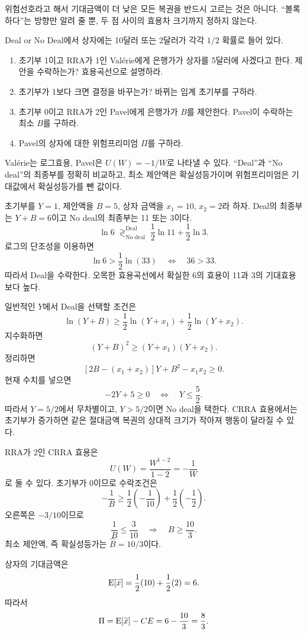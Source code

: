 \begin{warningbox}
위험선호라고 해서 기대금액이 더 낮은 모든 복권을 반드시 고르는 것은 아니다. ``볼록하다''는 방향만 알려 줄 뿐, 두 점 사이의 효용차 크기까지 정하지 않는다.
\end{warningbox}

\begin{officialbox}
Deal or No Deal에서 상자에는 10달러 또는 2달러가 각각 $1/2$ 확률로 들어 있다.
\begin{enumerate}[label=(\alph*)]
\item 초기부 1이고 RRA가 1인 Valérie에게 은행가가 상자를 5달러에 사겠다고 한다. 제안을 수락하는가? 효용곡선으로 설명하라.
\item 초기부가 1보다 크면 결정을 바꾸는가? 바뀌는 임계 초기부를 구하라.
\item 초기부 0이고 RRA가 2인 Pavel에게 은행가가 $B$를 제안한다. Pavel이 수락하는 최소 $B$를 구하라.
\item Pavel의 상자에 대한 위험프리미엄 $\Pi$를 구하라.
\end{enumerate}
\end{officialbox}

\begin{strategybox}
Valérie는 로그효용, Pavel은 $U(W)=-1/W$로 나타낼 수 있다. ``Deal''과 ``No deal''의 최종부를 정확히 비교하고, 최소 제안액은 확실성등가이며 위험프리미엄은 기대값에서 확실성등가를 뺀 값이다.
\end{strategybox}

\begin{solutionbox}
초기부를 $Y=1$, 제안액을 $B=5$, 상자 금액을 $x_1=10$, $x_2=2$라 하자. Deal의 최종부는 $Y+B=6$이고 No deal의 최종부는 11 또는 3이다.
\[
\ln6\;\mathop{\gtrless}_{\text{No deal}}^{\text{Deal}}\;
\frac12\ln11+\frac12\ln3.
\]
로그의 단조성을 이용하면
\[
\ln6>\frac12\ln(33)
\quad\Longleftrightarrow\quad 36>33.
\]
따라서 Deal을 수락한다. 오목한 효용곡선에서 확실한 6의 효용이 11과 3의 기대효용보다 높다.

일반적인 $Y$에서 Deal을 선택할 조건은
\[
\ln(Y+B)\ge\frac12\ln(Y+x_1)+\frac12\ln(Y+x_2).
\]
지수화하면
\[
(Y+B)^2\ge(Y+x_1)(Y+x_2).
\]
정리하면
\[
[2B-(x_1+x_2)]Y+B^2-x_1x_2\ge0.
\]
현재 수치를 넣으면
\[
-2Y+5\ge0
\quad\Longleftrightarrow\quad Y\le\frac52.
\]
따라서 $Y=5/2$에서 무차별이고, $Y>5/2$이면 No deal을 택한다. CRRA 효용에서는 초기부가 증가하면 같은 절대금액 복권의 상대적 크기가 작아져 행동이 달라질 수 있다.

RRA가 2인 CRRA 효용은
\[
U(W)=\frac{W^{1-2}}{1-2}=-\frac1W
\]
로 둘 수 있다. 초기부가 0이므로 수락조건은
\[
-\frac1B\ge\frac12\left(-\frac1{10}\right)+\frac12\left(-\frac12\right).
\]
오른쪽은 $-3/10$이므로
\[
\frac1B\le\frac3{10}
\quad\Longrightarrow\quad
\boxed{B\ge\frac{10}{3}}.
\]
최소 제안액, 즉 확실성등가는 $\widehat B=10/3$이다.

상자의 기대금액은
\[
\operatorname{E}[\widetilde x]=\frac12(10)+\frac12(2)=6.
\]
따라서
\[
\Pi=\operatorname{E}[\widetilde x]-CE
=6-\frac{10}{3}=\frac83.
\]
\end{solutionbox}

